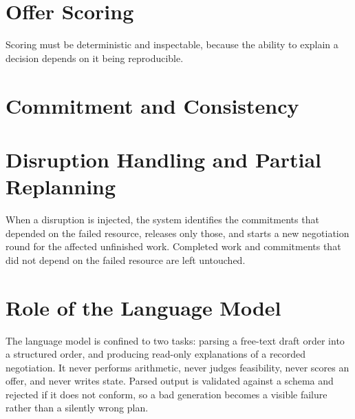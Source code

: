 
\section{Offer Scoring}

Scoring must be deterministic and inspectable, because the ability to explain a
decision depends on it being reproducible.


\section{Commitment and Consistency}


\section{Disruption Handling and Partial Replanning}

When a disruption is injected, the system identifies the commitments that
depended on the failed resource, releases only those, and starts a new
negotiation round for the affected unfinished work. Completed work and
commitments that did not depend on the failed resource are left untouched.


\section{Role of the Language Model}

The language model is confined to two tasks: parsing a free-text draft order
into a structured order, and producing read-only explanations of a recorded
negotiation. It never performs arithmetic, never judges feasibility, never
scores an offer, and never writes state. Parsed output is validated against a
schema and rejected if it does not conform, so a bad generation becomes a
visible failure rather than a silently wrong plan.

